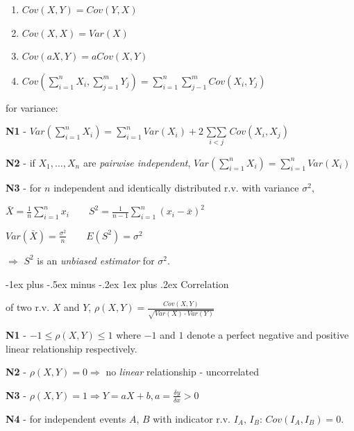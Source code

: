 \documentclass[10pt, landscape]{article}
\makeatletter
\renewcommand{\subsubsection}{\@startsection{subsubsection}{3}{0mm}%
  {-1ex plus -.5ex minus -.2ex}%
  {1ex plus .2ex}%
{\normalfont\small\bfseries}}%
\makeatother
\begin{document}
\begin{multicols*}{3}
    \begin{enumerate}
      \item $Cov(X, Y) = Cov(Y, X)$ 
      \item $Cov(X, X) = Var(X)$ 
      \item $Cov(aX, Y) = aCov(X, Y)$
      \item $Cov (\sum\limits^n_{i=1} X_i, \sum\limits^m_{j=1} Y_j) = \sum\limits^n_{i=1} \sum\limits^m_{j-1} Cov(X_i, Y_j) $
    \end{enumerate}

    for variance:

    \textbf{N1} - $Var (\sum\limits^n_{i=1} X_i) = \sum\limits^n_{i=1} Var(X_i) + 2 \mathop{\sum\sum}\limits_{i<j} Cov(X_i, X_j) $

    \textbf{N2} - if $X_1, \dots, X_n$ are \textit{pairwise independent}, $Var(\sum\limits^n_{i=1} X_i) = \sum\limits^n_{i=1} Var(X_i)$

    \textbf{N3} - for $n$ independent and identically distributed r.v. with variance  $\sigma^2$, 
    \begin{tightcenter}
      $\bar{X} = \frac{1}{n} \sum\limits^n_{i=1} x_i \quad\quad S^2 = \frac{1}{n-1} \sum\limits^n_{i=1} (x_i - \bar{x})^2$ 

      $Var (\bar{X}) = \frac{\sigma^2}{n} \quad\quad E(S^2) = \sigma^2 \quad\quad\quad\quad$
    \end{tightcenter}
    $\Rightarrow$ $S^2$ is an \textit{unbiased estimator} for $\sigma^2$.

    \subsubsection{Correlation}

    \begin{tightcenter}
       of two r.v. $X$ and $Y$, 
      $\rho(X, Y) = \frac{Cov(X, Y)}{\sqrt{Var(X) \cdot Var(Y)}}$
    \end{tightcenter}

    \textbf{N1} - $-1 \leq \rho(X, Y) \leq 1$
    where  $-1$ and $1$ denote a perfect negative and positive linear relationship respectively.

    \textbf{N2} - $\rho(X, Y) = 0 \Rightarrow$ no \textit{linear} relationship - uncorrelated

    \textbf{N3} - $\rho(X, Y) = 1 \Rightarrow Y = aX + b, a = \frac{\delta y}{\delta x} > 0$

    \textbf{N4} - for independent events $A$, $B$ with indicator r.v. $I_A$, $I_B$: $Cov(I_A, I_B) = 0$. 


\end{multicols*}
\end{document}
